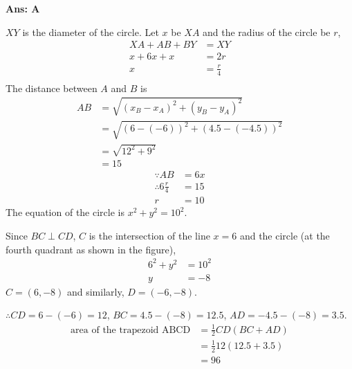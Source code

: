 \documentclass[varwidth=70mm]{standalone}
\begin{document}
\begin{answer}
\hrulefill\par
\textbf{Ans: A}

$XY$ is the diameter of the circle. Let $x$ be $XA$ and the radius of the circle be $r$,
\begin{equation*}
\begin{aligned}
XA+AB+BY &= XY \\
x+6x+x &= 2r \\
x &= \frac{r}{4} \\
\end{aligned}
\end{equation*}
The distance between $A$ and $B$ is
\begin{equation*}
\begin{aligned}
AB &= \sqrt{(x_B-x_A)^2 + (y_B-y_A)^2} \\
   &= \sqrt{(6-(-6))^2 + (4.5-(-4.5))^2} \\
   &= \sqrt{12^2+9^2} \\
   &= 15
\end{aligned}
\end{equation*}
\begin{equation*}
\begin{aligned}
\because AB &= 6x \\
\therefore 6\frac{r}{4} &= 15 \\
r &= 10
\end{aligned}
\end{equation*}
The equation of the circle is $x^2+y^2=10^2$.

Since $BC\perp CD$, $C$ is the intersection of the line $x=6$ and the circle (at the fourth quadrant as shown in the figure),
\begin{equation*}
\begin{aligned}
6^2+y^2 &= 10^2 \\
y &= -8
\end{aligned}
\end{equation*}
$C=(6,-8)$ and similarly, $D=(-6,-8)$. 

$\therefore CD=6-(-6)=12$, $BC=4.5-(-8)=12.5$, $AD=-4.5-(-8)=3.5$.
\begin{equation*}
\begin{aligned}
\text{area of the trapezoid ABCD} &= \frac{1}{2}CD(BC+AD) \\
								  &= \frac{1}{2}12(12.5+3.5) \\
								  &= 96
\end{aligned}
\end{equation*}
\end{answer}
\end{document}
